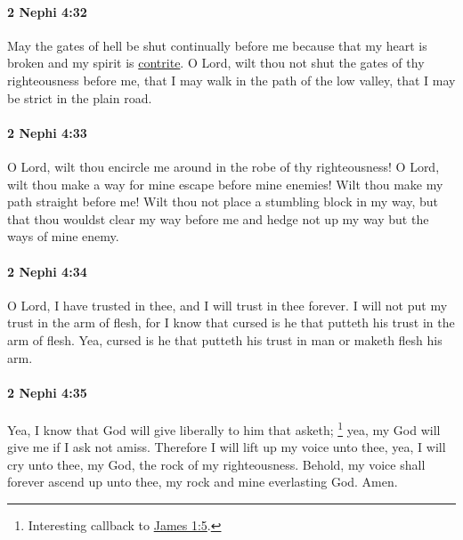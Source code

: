 		\paragraph{2 Nephi 4:32} %
			\label{2NEPHI-4-32}

			May the gates of hell be shut continually before me
			because that my heart is broken and my spirit is \hyperref[CONTRITE]{contrite}.
			O Lord, wilt thou not shut the gates of thy righteousness before me,
			that I may walk in the path of the low valley,
			that I may be strict in the plain road.

		\paragraph{2 Nephi 4:33} %
			\label{2NEPHI-4-33}

			O Lord, wilt thou encircle me around in the robe of thy righteousness!
			O Lord, wilt thou make a way for mine escape before mine enemies!
			Wilt thou make my path straight before me!
			Wilt thou not place a stumbling block in my way,
			but that thou wouldst clear my way before me
			and hedge not up my way but the ways of mine enemy.

		\paragraph{2 Nephi 4:34} %
			\label{2NEPHI-4-34}

			O Lord, I have trusted in thee,
			and I will trust in thee forever.
			I will not put my trust in the arm of flesh,
			for I know that cursed is he that putteth his trust in the arm of flesh.
			Yea, cursed is he that putteth his trust in man or maketh flesh his arm.

		\paragraph{2 Nephi 4:35} %
			\label{2NEPHI-4-35}

			Yea, I know that God will give liberally to him that asketh;%
				\footnote{%
					\label{2NEPHI-4-35-liberally}%
					Interesting callback to \hyperref[JAMES-1-5]{James 1:5}.
					}
			yea, my God will give me if I ask not amiss.
			Therefore I will lift up my voice unto thee,
			yea, I will cry unto thee, my God, the rock of my righteousness.
			Behold, my voice shall forever ascend up unto thee,
			my rock and mine everlasting God.
			Amen.

